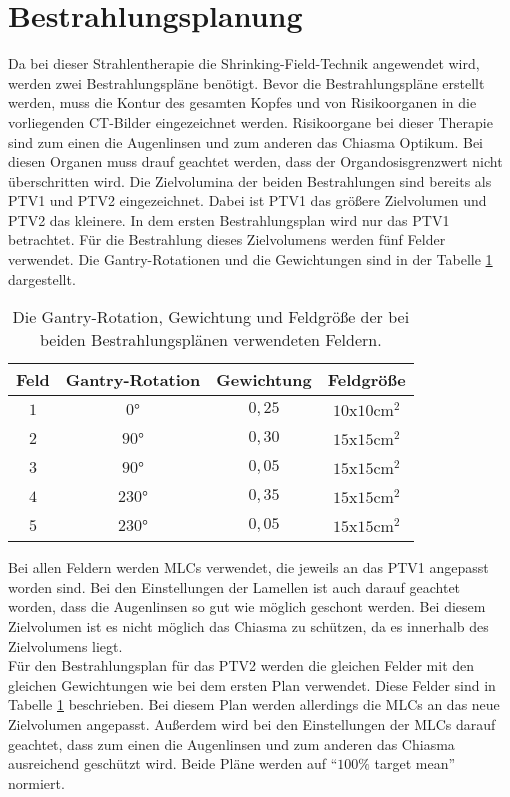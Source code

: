 \section{Bestrahlungsplanung}
\label{sec:Bestrahlungsplanung}

Da bei dieser Strahlentherapie die Shrinking-Field-Technik angewendet wird, werden zwei
Bestrahlungspläne benötigt.
Bevor die Bestrahlungspläne erstellt werden, muss die Kontur des gesamten Kopfes und von
Risikoorganen in die vorliegenden CT-Bilder eingezeichnet werden. Risikoorgane bei dieser
Therapie sind zum einen die Augenlinsen und zum anderen das Chiasma Optikum. Bei diesen
Organen muss drauf geachtet werden, dass der Organdosisgrenzwert nicht überschritten wird.
Die Zielvolumina der beiden Bestrahlungen sind bereits als PTV1 und PTV2 eingezeichnet. Dabei
ist PTV1 das größere Zielvolumen und PTV2 das kleinere.
In dem ersten Bestrahlungsplan wird nur das PTV1 betrachtet. Für die Bestrahlung dieses Zielvolumens werden
fünf Felder verwendet. Die Gantry-Rotationen und die Gewichtungen sind in der Tabelle \ref{tab:Felder1} dargestellt.

\begin{table}
  \centering
  \caption{Die Gantry-Rotation, Gewichtung und Feldgröße der bei beiden Bestrahlungsplänen verwendeten Feldern.}
  \label{tab:Felder1}
  \begin{tabular}{c c c c}
    \toprule
    Feld & Gantry-Rotation & Gewichtung & Feldgröße\\
    \midrule
    $1$ & $0°$ & $0,25$ & $10$x$10 \si{\centi\meter\squared}$ \\
    $2$ & $90°$ & $0,30$ & $15$x$15 \si{\centi\meter\squared}$ \\
    $3$ & $90°$ & $0,05$ & $15$x$15 \si{\centi\meter\squared}$ \\
    $4$ & $230°$ & $0,35$ & $15$x$15 \si{\centi\meter\squared}$ \\
    $5$ & $230°$ & $0,05$ & $15$x$15 \si{\centi\meter\squared}$ \\
    \bottomrule
  \end{tabular}
\end{table}

Bei allen Feldern werden MLCs verwendet, die jeweils an das PTV1 angepasst worden sind.
Bei den Einstellungen der Lamellen ist auch darauf geachtet worden, dass die Augenlinsen
so gut wie möglich geschont werden. Bei diesem Zielvolumen ist es nicht möglich das Chiasma
zu schützen, da es innerhalb des Zielvolumens liegt. \\
Für den Bestrahlungsplan für das PTV2 werden die gleichen Felder mit den gleichen
Gewichtungen wie bei dem ersten Plan verwendet. Diese Felder sind in Tabelle \ref{tab:Felder1} beschrieben.
Bei diesem Plan werden allerdings die MLCs an das neue Zielvolumen angepasst. Außerdem
wird bei den Einstellungen der MLCs darauf geachtet, dass zum einen die Augenlinsen und
zum anderen das Chiasma ausreichend geschützt wird. Beide Pläne werden auf \enquote{$100\%$ target mean} normiert.
